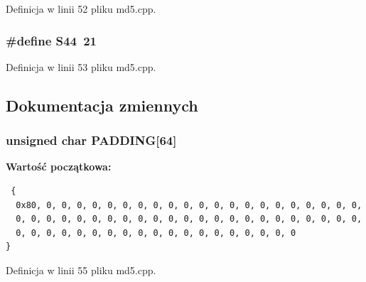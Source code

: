 Definicja w linii 52 pliku md5.cpp.\hypertarget{a00010_6a3989af72b55d169bd73a66f8620aae}{
\subsubsection[{S44}]{\setlength{\rightskip}{0pt plus 5cm}\#define S44~21}}
\label{d7/dec/a00010_6a3989af72b55d169bd73a66f8620aae}




Definicja w linii 53 pliku md5.cpp.

\subsection{Dokumentacja zmiennych}
\hypertarget{a00010_ee6f420120b0fbc0fb096cb61655cec4}{
\subsubsection[{PADDING}]{\setlength{\rightskip}{0pt plus 5cm}unsigned char {\bf PADDING}\mbox{[}64\mbox{]}}}
\label{d7/dec/a00010_ee6f420120b0fbc0fb096cb61655cec4}


\textbf{Wartość początkowa:}

\begin{Code}\begin{verbatim} {
  0x80, 0, 0, 0, 0, 0, 0, 0, 0, 0, 0, 0, 0, 0, 0, 0, 0, 0, 0, 0, 0, 0,
  0, 0, 0, 0, 0, 0, 0, 0, 0, 0, 0, 0, 0, 0, 0, 0, 0, 0, 0, 0, 0, 0, 0,
  0, 0, 0, 0, 0, 0, 0, 0, 0, 0, 0, 0, 0, 0, 0, 0, 0, 0, 0
}
\end{verbatim}
\end{Code}


Definicja w linii 55 pliku md5.cpp.